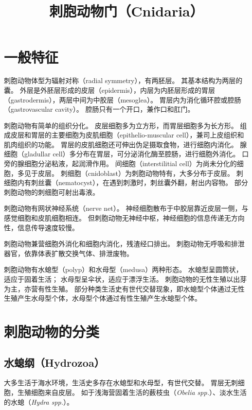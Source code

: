 \documentclass[11pt]{article}
\title{刺胞动物门（Cnidaria）}
\date{}
\begin{document}
  \maketitle

  \linenumbers
\section{一般特征}
刺胞动物体型为辐射对称（radial symmetry），有两胚层。
其基本结构为两层的囊。
外层是外胚层形成的皮层（epidermis），内层为内胚层形成的胃层（gastrodermis），两层中间为中胶层（mesoglea）。
胃层内为消化循环腔或腔肠（gastrovascular cavity）。
腔肠只有一个开口，兼作口和肛门。

\newline

刺胞动物有简单的组织分化。
皮层细胞多为立方形，而胃层细胞多为长方形。
组成皮层和胃层的主要细胞为皮肌细胞（epithelio-muscular cell），兼司上皮组织和肌肉组织的功能。
胃层的皮肌细胞还可伸出伪足摄取食物，进行细胞内消化。
腺细胞（gladullar cell）多分布在胃层，可分泌消化酶至腔肠，进行细胞外消化。
口旁的腺细胞分泌粘液，起润滑作用。
间细胞（interstilitial cell）为尚未分化的细胞，多见于皮层。
刺细胞（cnidoblast）为刺胞动物特有，大多分布于皮层。
刺细胞内有刺丝囊（nematocyst），在遇到刺激时，刺丝囊外翻，射出内容物。
部分刺胞动物的刺细胞可射出毒液。

\newline

刺胞动物有网状神经系统（nerve net）。
神经细胞散布于中胶层靠近皮层一侧，与感觉细胞和皮肌细胞相连。
但刺胞动物无神经中枢，神经细胞的信息传递无方向性，信息传导速度较慢。

\newline

刺胞动物兼营细胞外消化和细胞内消化，残渣经口排出。
刺胞动物无呼吸和排泄器官，依靠体表扩散交换气体、排泄废物。

\newline

刺胞动物有水螅型（polyp）和水母型（medusa）两种形态。
水螅型呈圆筒状，适应于固着生活；
水母型呈伞状，适应于漂浮生活。
刺胞动物的无性生殖以出芽为主，亦营有性生殖。
部分种类生活史有世代交替现象，即水螅型个体通过无性生殖产生水母型个体，水母型个体通过有性生殖产生水螅型个体。
  
\section{刺胞动物的分类}
\subsection{水螅纲（Hydrozoa）}
大多生活于海水环境，生活史多存在水螅型和水母型，有世代交替。
胃层无刺细胞，生殖细胞来自皮层。
如于浅海营固着生活的薮枝虫（\textit{Obelia spp.}）、淡水生活的水螅（\textit{Hydra spp.}）。
  
\end{document}
